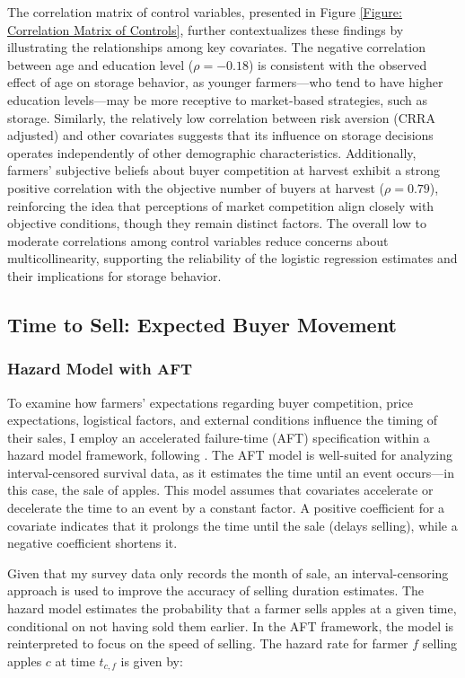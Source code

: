 The correlation matrix of control variables, presented in Figure \ref{Figure: Correlation Matrix of Controls}, further contextualizes these findings by illustrating the relationships among key covariates. The negative correlation between age and education level (\(\rho = -0.18\)) is consistent with the observed effect of age on storage behavior, as younger farmers—who tend to have higher education levels—may be more receptive to market-based strategies, such as storage. Similarly, the relatively low correlation between risk aversion (CRRA adjusted) and other covariates suggests that its influence on storage decisions operates independently of other demographic characteristics. Additionally, farmers’ subjective beliefs about buyer competition at harvest exhibit a strong positive correlation with the objective number of buyers at harvest (\(\rho = 0.79\)), reinforcing the idea that perceptions of market competition align closely with objective conditions, though they remain distinct factors. The overall low to moderate correlations among control variables reduce concerns about multicollinearity, supporting the reliability of the logistic regression estimates and their implications for storage behavior.



\subsection{Time to Sell: Expected Buyer Movement}

\subsubsection{Hazard Model with AFT}
\noindent 
To examine how farmers' expectations regarding buyer competition, price expectations, logistical factors, and external conditions influence the timing of their sales, I employ an accelerated failure-time (AFT) specification within a hazard model framework, following \cite{albuquerque2024market}. The AFT model is well-suited for analyzing interval-censored survival data, as it estimates the time until an event occurs—in this case, the sale of apples. This model assumes that covariates accelerate or decelerate the time to an event by a constant factor. A positive coefficient for a covariate indicates that it prolongs the time until the sale (delays selling), while a negative coefficient shortens it.

Given that my survey data only records the month of sale, an interval-censoring approach is used to improve the accuracy of selling duration estimates. The hazard model estimates the probability that a farmer sells apples at a given time, conditional on not having sold them earlier. In the AFT framework, the model is reinterpreted to focus on the speed of selling. The hazard rate for farmer \(f\) selling apples \(c\) at time \(t_{c,f}\) is given by:

